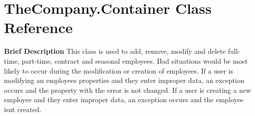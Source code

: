 \hypertarget{class_the_company_1_1_container}{}\section{The\+Company.\+Container Class Reference}
\label{class_the_company_1_1_container}


{\bfseries Brief Description} This class is used to add, remove, modify and delete full-\/time, part-\/time, contract and seasonal employees. Bad situations would be most likely to occur during the modification or creation of employees. If a user is modifying an employee\textquotesingle{}s properties and they enter improper data, an exception occurs and the property with the error is not changed. If a user is creating a new employee and they enter improper data, an exception occurs and the employee isn\textquotesingle{}t created.  



